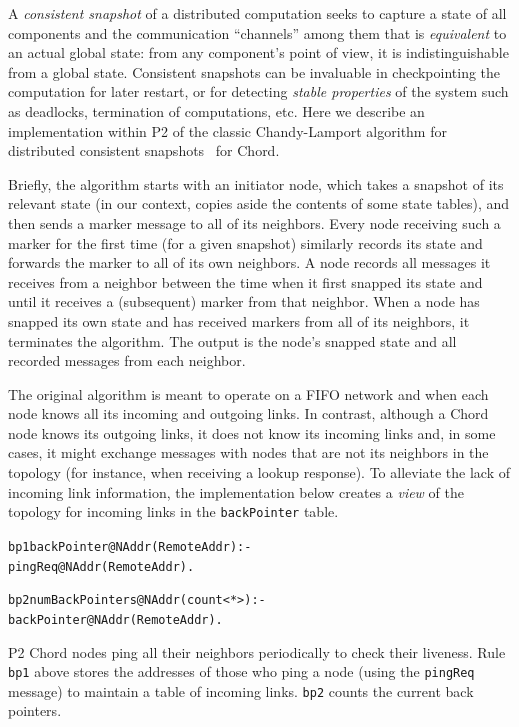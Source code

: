 \documentclass{sig-alt-full}
\newenvironment{overlog}{\begin{alltt}\footnotesize}{\end{alltt}}
\newcommand{\ol}[1]{{\tt\footnotesize#1}}
\begin{document}
A \emph{consistent snapshot} of a
distributed computation seeks to capture a state of all components and
the communication ``channels'' among them that is \emph{equivalent} to an
actual global state: from any component's point of
view, it is indistinguishable from a global state.  Consistent
snapshots can be invaluable in checkpointing the computation for
later restart, or for detecting \emph{stable properties} of the
system such as deadlocks, termination of computations, etc.  Here
we describe an implementation within P2 of the classic
Chandy-Lamport algorithm for distributed consistent
snapshots~\cite{Chandy1985} for Chord.

Briefly, the algorithm starts with an initiator node, which takes a
snapshot of its relevant state (in our context, copies aside the
contents of some state tables), and then sends a marker message to all of its
neighbors.  Every node receiving such a marker for the first time (for a
given snapshot) similarly records its state and forwards the marker to
all of its own neighbors.  A node records all messages it receives from
a neighbor between the time when it first snapped its state and until it
receives a (subsequent) marker from that neighbor.  When a node has
snapped its own state and has received markers from all of its
neighbors, it terminates the algorithm.  The output is the node's
snapped state and all recorded messages from each neighbor.

The original algorithm is meant to operate on a FIFO network and when each
node knows all its incoming and outgoing links.  In contrast,
although a Chord node knows its outgoing links, it does not know its
incoming links and, in some cases, it might exchange messages with nodes
that are not its neighbors in the topology (for instance, when receiving
a lookup response).  To alleviate the lack of incoming link information,
the implementation below creates a \emph{view} of the topology for
incoming links in the \ol{backPointer} table.
\begin{overlog}
bp1 backPointer@NAddr(RemoteAddr) :-
   pingReq@NAddr(RemoteAddr).

bp2 numBackPointers@NAddr(count<*>) :-
   backPointer@NAddr(RemoteAddr).
\end{overlog}
P2 Chord nodes ping all their neighbors periodically
to check their liveness.  Rule \ol{bp1} above stores
the addresses of those who ping a node (using the
\ol{pingReq} message) to maintain a table of incoming
links.  \ol{bp2} counts the current back pointers.
\end{document}

